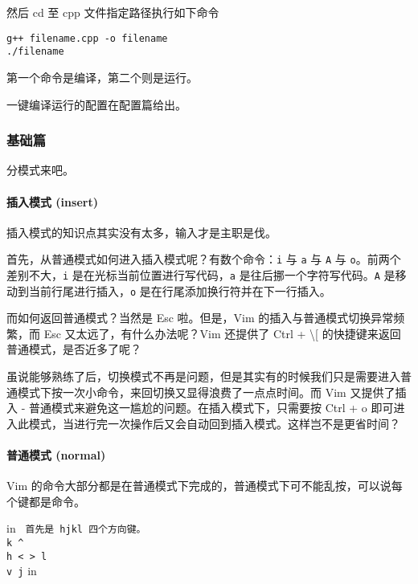 然后 cd 至 cpp 文件指定路径执行如下命令

\begin{verbatim}
g++ filename.cpp -o filename
./filename
\end{verbatim}

第一个命令是编译，第二个则是运行。

一键编译运行的配置在配置篇给出。

\subsubsection{基础篇}

分模式来吧。

\paragraph{插入模式 (insert)}

插入模式的知识点其实没有太多，输入才是主职是伐。

首先，从普通模式如何进入插入模式呢？有数个命令：\texttt{i} 与 \texttt{a} 与 \texttt{A} 与 \texttt{o}。前两个差别不大，\texttt{i} 是在光标当前位置进行写代码，\texttt{a} 是往后挪一个字符写代码。\texttt{A} 是移动到当前行尾进行插入，\texttt{o} 是在行尾添加换行符并在下一行插入。

而如何返回普通模式？当然是 Esc 啦。但是，Vim 的插入与普通模式切换异常频繁，而 Esc 又太远了，有什么办法呢？Vim 还提供了 Ctrl + \textbackslash{}[ 的快捷键来返回普通模式，是否近多了呢？

虽说能够熟练了后，切换模式不再是问题，但是其实有的时候我们只是需要进入普通模式下按一次小命令，来回切换又显得浪费了一点点时间。而 Vim 又提供了插入 - 普通模式来避免这一尴尬的问题。在插入模式下，只需要按 Ctrl + o 即可进入此模式，当进行完一次操作后又会自动回到插入模式。这样岂不是更省时间？

\paragraph{普通模式 (normal)}

Vim 的命令大部分都是在普通模式下完成的，普通模式下可不能乱按，可以说每个键都是命令。

 in
\texttt{
首先是 hjkl 四个方向键。                         \\                                              k ^\\                                           h <     > l\\                                                v j}
 in

